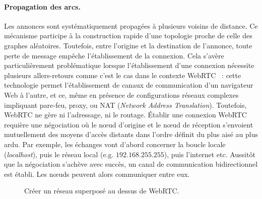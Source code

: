 \paragraph{Propagation des arcs.} Les annonces sont systématiquement propagées à
plusieurs voisins de distance. Ce mécanisme participe à la construction rapide
d'une topologie proche de celle des graphes aléatoires. Toutefois, entre
l'origine et la destination de l'annonce, toute perte de message empêche
l'établissement de la connexion. Cela s'avère particulièrement problématique
lorsque l'établissement d'une connexion nécessite plusieurs allers-retours comme
c'est le cas dans le contexte WebRTC~\cite{webrtc} : 
cette technologie permet l'établissement de canaux de communication d'un
navigateur Web à l'autre, et ce, même en présence de configurations réseaux
complexes impliquant pare-feu, proxy, ou NAT (\emph{Network Address
  Translation}). Toutefois, WebRTC ne gère ni l'adressage, ni le routage.
Établir une connexion WebRTC requière une négociation où le nœud d'origine et le
nœud de réception s'envoient mutuellement des moyens d'accès distants dans
l'ordre définit du plus aisé au plus ardu. Par exemple, les échanges vont
d'abord concerner la boucle locale (\emph{localhost}), puis le réseau local
(e.g. $192.168.255.255$), puis l'internet etc. Aussitôt que la négociation
s'achève avec succès, un canal de communication bidirectionnel est établi. Les
nœuds peuvent alors communiquer entre eux.

\begin{figure*}
  \begin{center}
    \hspace{5pt}
    \hspace{5pt}
    \caption[Création d'un réseau superposé sur WebRTC]
    {\label{fig:webrtc}Créer un réseau superposé au dessus de WebRTC.}
  \end{center}
\end{figure*}


